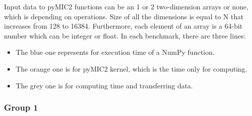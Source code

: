 Input data to pyMIC2 functions can be an 1 or 2 two-dimension arrays or none, which is depending on operations. Size of all the dimensions is equal to N that increases from 128 to 16384. Furthermore, each element of an array is a 64-bit number which can be integer or float. In each benchmark, there are three lines:
\begin{itemize}
	\item The blue one represents for execution time of a NumPy function.
	\item The orange one is for pyMIC2 kernel, which is the time only for computing.
	\item The grey one is for computing time and transferring data.
\end{itemize}

\subsubsection{Group 1}


